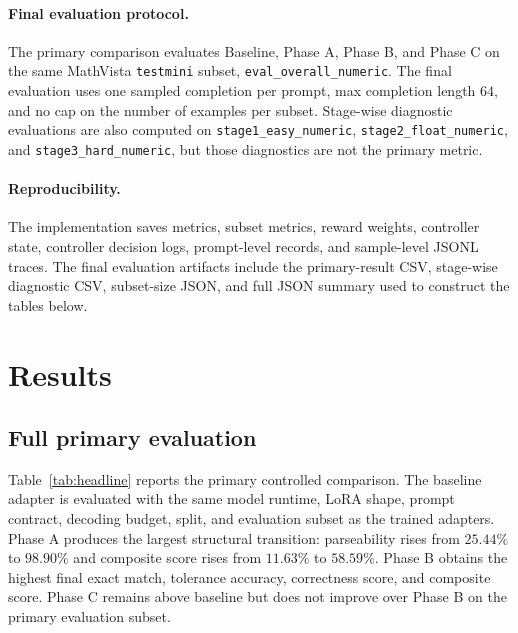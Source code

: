 \documentclass{article} %
\begin{document}
\paragraph{Final evaluation protocol.}
The primary comparison evaluates Baseline, Phase A, Phase B, and Phase C on the same MathVista \texttt{testmini} subset, \texttt{eval\_overall\_numeric}. The final evaluation uses one sampled completion per prompt, max completion length $64$, and no cap on the number of examples per subset. Stage-wise diagnostic evaluations are also computed on \texttt{stage1\_easy\_numeric}, \texttt{stage2\_float\_numeric}, and \texttt{stage3\_hard\_numeric}, but those diagnostics are not the primary metric.

\paragraph{Reproducibility.}
The implementation saves metrics, subset metrics, reward weights, controller state, controller decision logs, prompt-level records, and sample-level JSONL traces. The final evaluation artifacts include the primary-result CSV, stage-wise diagnostic CSV, subset-size JSON, and full JSON summary used to construct the tables below.

\section{Results}

\subsection{Full primary evaluation}

Table~\ref{tab:headline} reports the primary controlled comparison. The baseline adapter is evaluated with the same model runtime, LoRA shape, prompt contract, decoding budget, split, and evaluation subset as the trained adapters. Phase A produces the largest structural transition: parseability rises from $25.44\%$ to $98.90\%$ and composite score rises from $11.63\%$ to $58.59\%$. Phase B obtains the highest final exact match, tolerance accuracy, correctness score, and composite score. Phase C remains above baseline but does not improve over Phase B on the primary evaluation subset.
\end{document}
